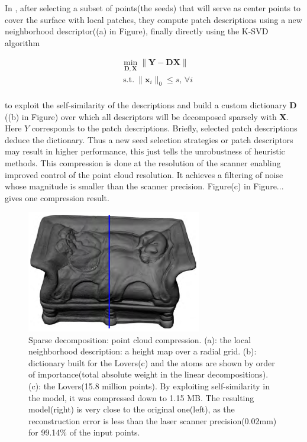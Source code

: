 In \cite{digne2014self}, after selecting a subset of points(the seeds) that will serve as center points to cover the surface with local patches,
they compute patch descriptions using a new neighborhood descriptor((a) in Figure),
finally directly using the K-SVD algorithm \cite{aharon2006svd}

\small{
\begin{equation}
\label{eq:dictcompression}
\begin{split}
&\min_{\mathbf{D},\mathbf{X}}  \|\mathbf{Y}-\mathbf{D}\mathbf{X}\| \\
&~\mathrm{s.t.}~ \|\mathbf{x}_i\|_0 \leq s,\,\forall i
\end{split}
\end{equation}
}
\\
to exploit the self-similarity of the descriptions and build a custom dictionary $\mathbf{D}$((b) in Figure) over which all descriptors will be decomposed sparsely with $\mathbf{X}$.
Here $Y$ corresponds to the patch descriptions.
Briefly, selected patch descriptions deduce the dictionary.
Thus a new seed selection strategies or patch descriptors may result in higher performance,
this just tells the unrobustness of heuristic methods.
This compression is done at the resolution of the scanner enabling improved control of the point cloud resolution.
It achieves a filtering of noise whose magnitude is smaller than the scanner precision.
Figure(c) in Figure... gives one compression result.

\begin{figure}[ht]
  \centering
  \includegraphics[width=3.0in]{images/compression_learning}
  \caption{Sparse decomposition: point cloud compression\cite{digne2014self}. (a): the local neighborhood description: a height map over a radial grid. (b): dictionary built for the Lovers(c) and the atoms are shown by order of importance(total absolute weight in the linear decompositions). (c): the Lovers(15.8 million points). By exploiting self-similarity in the model, it was compressed down to 1.15 MB. The resulting model(right) is very close to the original one(left), as the reconstruction error is less than the laser scanner precision(0.02mm) for 99.14\% of the input points.}
\end{figure}


